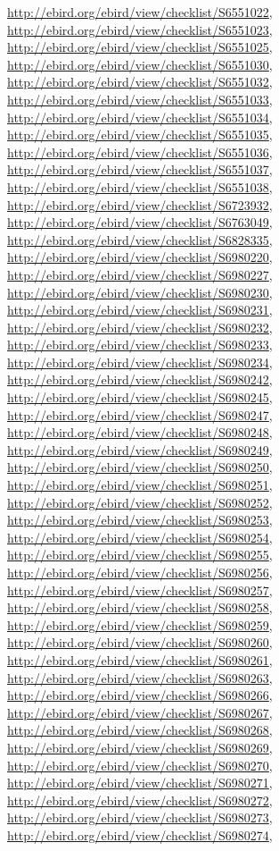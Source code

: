 \documentclass[9pt, article]{memoir}
\begin{document}
\begin{multicols}{2}
\url{http://ebird.org/ebird/view/checklist/S6551022}, 
\url{http://ebird.org/ebird/view/checklist/S6551023}, 
\url{http://ebird.org/ebird/view/checklist/S6551025}, 
\url{http://ebird.org/ebird/view/checklist/S6551030}, 
\url{http://ebird.org/ebird/view/checklist/S6551032}, 
\url{http://ebird.org/ebird/view/checklist/S6551033}, 
\url{http://ebird.org/ebird/view/checklist/S6551034}, 
\url{http://ebird.org/ebird/view/checklist/S6551035}, 
\url{http://ebird.org/ebird/view/checklist/S6551036}, 
\url{http://ebird.org/ebird/view/checklist/S6551037}, 
\url{http://ebird.org/ebird/view/checklist/S6551038}, 
\url{http://ebird.org/ebird/view/checklist/S6723932}, 
\url{http://ebird.org/ebird/view/checklist/S6763049}, 
\url{http://ebird.org/ebird/view/checklist/S6828335}, 
\url{http://ebird.org/ebird/view/checklist/S6980220}, 
\url{http://ebird.org/ebird/view/checklist/S6980227}, 
\url{http://ebird.org/ebird/view/checklist/S6980230}, 
\url{http://ebird.org/ebird/view/checklist/S6980231}, 
\url{http://ebird.org/ebird/view/checklist/S6980232}, 
\url{http://ebird.org/ebird/view/checklist/S6980233}, 
\url{http://ebird.org/ebird/view/checklist/S6980234}, 
\url{http://ebird.org/ebird/view/checklist/S6980242}, 
\url{http://ebird.org/ebird/view/checklist/S6980245}, 
\url{http://ebird.org/ebird/view/checklist/S6980247}, 
\url{http://ebird.org/ebird/view/checklist/S6980248}, 
\url{http://ebird.org/ebird/view/checklist/S6980249}, 
\url{http://ebird.org/ebird/view/checklist/S6980250}, 
\url{http://ebird.org/ebird/view/checklist/S6980251}, 
\url{http://ebird.org/ebird/view/checklist/S6980252}, 
\url{http://ebird.org/ebird/view/checklist/S6980253}, 
\url{http://ebird.org/ebird/view/checklist/S6980254}, 
\url{http://ebird.org/ebird/view/checklist/S6980255}, 
\url{http://ebird.org/ebird/view/checklist/S6980256}, 
\url{http://ebird.org/ebird/view/checklist/S6980257}, 
\url{http://ebird.org/ebird/view/checklist/S6980258}, 
\url{http://ebird.org/ebird/view/checklist/S6980259}, 
\url{http://ebird.org/ebird/view/checklist/S6980260}, 
\url{http://ebird.org/ebird/view/checklist/S6980261}, 
\url{http://ebird.org/ebird/view/checklist/S6980263}, 
\url{http://ebird.org/ebird/view/checklist/S6980266}, 
\url{http://ebird.org/ebird/view/checklist/S6980267}, 
\url{http://ebird.org/ebird/view/checklist/S6980268}, 
\url{http://ebird.org/ebird/view/checklist/S6980269}, 
\url{http://ebird.org/ebird/view/checklist/S6980270}, 
\url{http://ebird.org/ebird/view/checklist/S6980271}, 
\url{http://ebird.org/ebird/view/checklist/S6980272}, 
\url{http://ebird.org/ebird/view/checklist/S6980273}, 
\url{http://ebird.org/ebird/view/checklist/S6980274}, 

\end{multicols}
\end{document}
